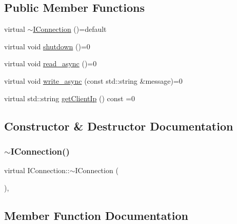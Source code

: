 \subsection*{Public Member Functions}
\begin{DoxyCompactItemize}
\item 
virtual \mbox{\hyperlink{classIConnection_ad1c78f7f02b93d498d352ed5a2a5cd31}{$\sim$\+I\+Connection}} ()=default
\item 
virtual void \mbox{\hyperlink{classIConnection_ae15b6922f3a31a7f316a6390eb2469b2}{shutdown}} ()=0
\item 
virtual void \mbox{\hyperlink{classIConnection_a1c9d492241a79546f243088285279144}{read\+\_\+async}} ()=0
\item 
virtual void \mbox{\hyperlink{classIConnection_a7210f770ebae6277e98142a8b5a6226f}{write\+\_\+async}} (const std\+::string \&message)=0
\item 
virtual std\+::string \mbox{\hyperlink{classIConnection_a7064757e5c427496f482239dde7e0540}{get\+Client\+Ip}} () const =0
\end{DoxyCompactItemize}


\subsection{Constructor \& Destructor Documentation}
\mbox{\label{classIConnection_ad1c78f7f02b93d498d352ed5a2a5cd31}} 
\subsubsection{\texorpdfstring{$\sim$\+I\+Connection()}{~IConnection()}}
{\footnotesize\ttfamily virtual I\+Connection\+::$\sim$\+I\+Connection (\begin{DoxyParamCaption}{ }\end{DoxyParamCaption})\hspace{0.3cm}{\ttfamily [virtual]}, {\ttfamily [default]}}



\subsection{Member Function Documentation}
\mbox{\label{classIConnection_a7064757e5c427496f482239dde7e0540}} 
